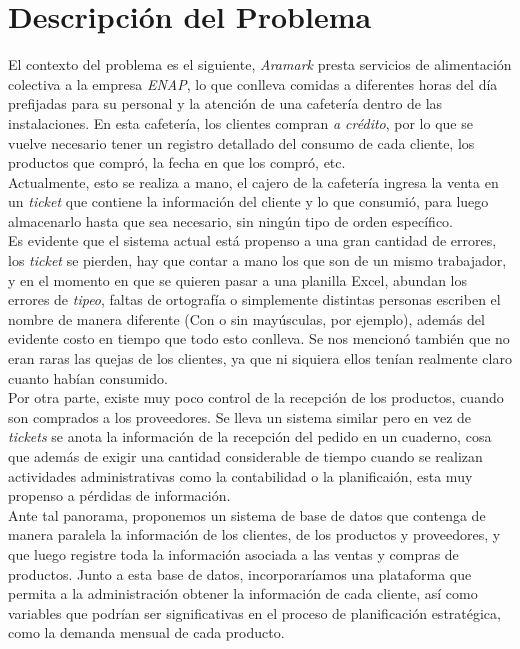 \documentclass[12pt]{article}
\begin{document}
	\section{Descripci\'on del Problema}
	El contexto del problema es el siguiente, \textit{Aramark} presta servicios de alimentaci\'on colectiva a la empresa \textit{ENAP}, lo que conlleva comidas a diferentes horas del d\'ia prefijadas para su personal y la atenci\'on de una cafeter\'ia dentro de las instalaciones. En esta cafeter\'ia, los clientes compran \textit{a cr\'edito}, por lo que se vuelve necesario tener un registro detallado del consumo de cada cliente, los productos que compr\'o, la fecha en que los compr\'o, etc.\\
	Actualmente, esto se realiza a mano, el cajero de la cafeter\'ia ingresa la venta en un \textit{ticket} que contiene la informaci\'on del cliente y lo que consumi\'o, para luego almacenarlo hasta que sea necesario, sin ning\'un tipo de orden espec\'ifico.\\
	Es evidente que el sistema actual est\'a propenso a una gran cantidad de errores, los \textit{ticket} se pierden, hay que contar a mano los que son de un mismo trabajador, y en el momento en que se quieren pasar a una planilla Excel, abundan los errores de \textit{tipeo}, faltas de ortograf\'ia o simplemente distintas personas escriben el nombre de manera diferente (Con o sin may\'usculas, por ejemplo), adem\'as del evidente costo en tiempo que todo esto conlleva. Se nos mencion\'o tambi\'en que no eran raras las quejas de los clientes, ya que ni siquiera ellos ten\'ian realmente claro cuanto hab\'ian consumido.\\
	Por otra parte, existe muy poco control de la recepci\'on de los productos, cuando son comprados a los proveedores. Se lleva un sistema similar pero en vez de \textit{tickets} se anota la informaci\'on de la recepci\'on del pedido en un cuaderno, cosa que adem\'as de exigir una cantidad considerable de tiempo cuando se realizan actividades administrativas como la contabilidad o la planificai\'on, esta muy propenso a p\'erdidas de informaci\'on.\\
	Ante tal panorama, proponemos un sistema de base de datos que contenga de manera paralela la informaci\'on de los clientes, de los productos y proveedores, y que luego registre toda la informaci\'on asociada a las ventas y compras de productos. Junto a esta base de datos, incorporar\'iamos una plataforma que permita a la administraci\'on obtener la informaci\'on de cada cliente, as\'i como variables que podr\'ian ser significativas en el proceso de planificaci\'on estrat\'egica, como la demanda mensual de cada producto.
	\newpage
\end{document}
